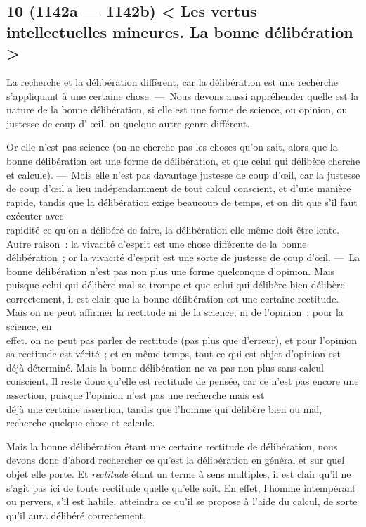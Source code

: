 \documentclass[french,twoside]{book} %
\begin{document}
\subsection[{10 (1142a — 1142b) < Les vertus intellectuelles mineures. La bonne délibération >}]{10 (1142a — 1142b) < Les vertus intellectuelles mineures. La bonne délibération >}
\noindent La recherche et la délibération diffèrent, car la délibération est une recherche s’appliquant à une certaine chose. — Nous devons aussi appréhender quelle est la nature de la bonne délibération, si elle est une forme de science, ou opinion, ou justesse de coup d’ œil, ou quelque autre genre différent.\par
 Or elle n’est pas science (on ne cherche pas les choses qu’on sait, alors que la bonne délibération est une forme de délibération, et que celui qui délibère cherche et calcule). — Mais elle n’est pas davantage justesse de coup d’œil, car la justesse de coup d’œil a lieu indépendamment de tout calcul conscient, et d’une manière rapide, tandis que la délibération exige beaucoup de temps, et on dit que s’il faut exécuter avec \\
rapidité ce qu’on a délibéré de faire, la délibération elle-même doit être lente. Autre raison : la vivacité d’esprit est une chose différente de la bonne délibération ; or la vivacité d’esprit est une sorte de justesse de coup d’œil. — La bonne délibération n’est pas non plus une forme quelconque d’opinion. Mais puisque celui qui délibère mal se trompe et que celui qui délibère bien délibère correctement, il est clair que la bonne délibération est une certaine rectitude. Mais on ne peut affirmer la rectitude ni de la science, ni de l’opinion : pour la science, en \\
effet. on ne peut pas parler de rectitude (pas plus que d’erreur), et pour l’opinion sa rectitude est vérité ; et en même temps, tout ce qui est objet d’opinion est déjà déterminé. Mais la bonne délibération ne va pas non plus sans calcul conscient. Il reste donc qu’elle est rectitude de pensée, car ce n’est pas encore une assertion, puisque l’opinion n’est pas une recherche mais est \\
déjà une certaine assertion, tandis que l’homme qui délibère bien ou mal, recherche quelque chose et calcule.\par
Mais la bonne délibération étant une certaine rectitude de délibération, nous devons donc d’abord rechercher ce qu’est la délibération en général et sur quel objet elle porte. Et {\itshape rectitude} étant un terme à sens multiples, il est clair qu’il ne s’agit pas ici de toute rectitude quelle qu’elle soit. En effet, l’homme intempérant ou pervers, s’il est habile, atteindra ce qu’il se propose à l’aide du calcul, de sorte qu’il aura délibéré correctement, \\
\end{document}
